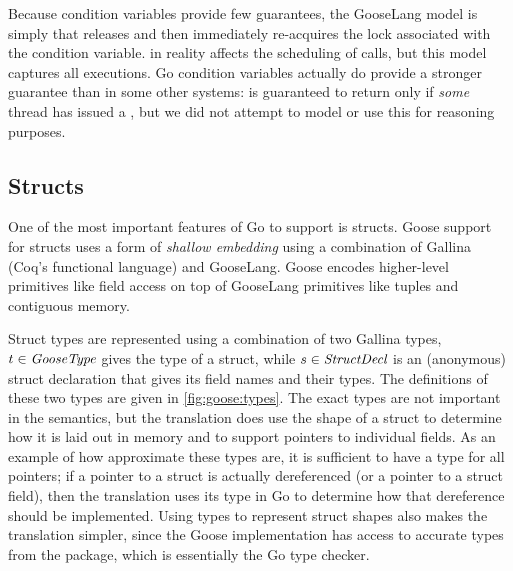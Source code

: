 Because condition variables provide few guarantees, the GooseLang model is
simply that  releases and then immediately re-acquires the lock associated with the
condition variable.  in reality affects the scheduling of
 calls, but this model captures all executions. Go condition variables actually do provide a stronger
guarantee than in some other systems:  is guaranteed to return only if
\emph{some} thread has issued a , but we did not attempt to model
or use this for reasoning purposes.

\subsection{Structs}
\label{sec:goose:structs}


One of the most important features of Go to support is structs. Goose support
for structs uses a form of \emph{shallow embedding} using a combination of
Gallina (Coq's functional language) and GooseLang. Goose encodes
higher-level primitives like field access on top of GooseLang primitives like
tuples and contiguous memory.

Struct types are represented using a combination of two Gallina types,
$t \in \textit{GooseType}$ gives the type of a struct, while
$s \in \textit{StructDecl}$ is an (anonymous) struct declaration that gives its
field names and their types. The definitions of these two types are given in
\cref{fig:goose:types}. The exact types are not important in the semantics,
but the translation does use the shape of a struct to determine how it is laid
out in memory and to support pointers to individual fields. As an example of how
approximate these types are, it is sufficient to have a  type for
all pointers; if a pointer to a struct is actually dereferenced (or a pointer to a
struct field), then the translation uses its type in Go to determine how that
dereference should be implemented. Using types to represent struct shapes
also makes the translation simpler, since the Goose implementation has
access to accurate types from the  package, which is essentially
the Go type checker.

